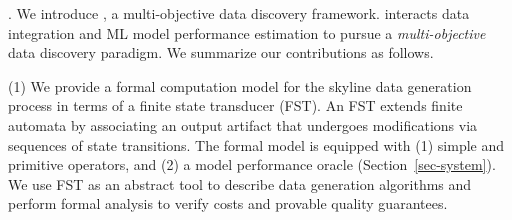 %

\vspace{.5ex}
. 
We introduce \modis, a 
multi-objective data discovery 
framework. \modis 
interacts data integration 
and ML model performance estimation 
to pursue a {\em multi-objective} 
data discovery paradigm. We summarize 
our contributions as follows. 

\stab
(1) 
We provide a formal computation model for 
the skyline data generation process in 
terms of a 
finite state transducer (FST). 
An FST extends finite automata by associating 
an output artifact that undergoes modifications 
via sequences of state transitions. 
The formal model is 
equipped with (1) simple and primitive 
operators, 
and (2) a model performance oracle %
(Section~\ref{sec-system}). 
We use FST as an abstract 
tool to describe 
data generation algorithms and 
perform formal analysis to 
verify costs and 
provable quality guarantees. 

